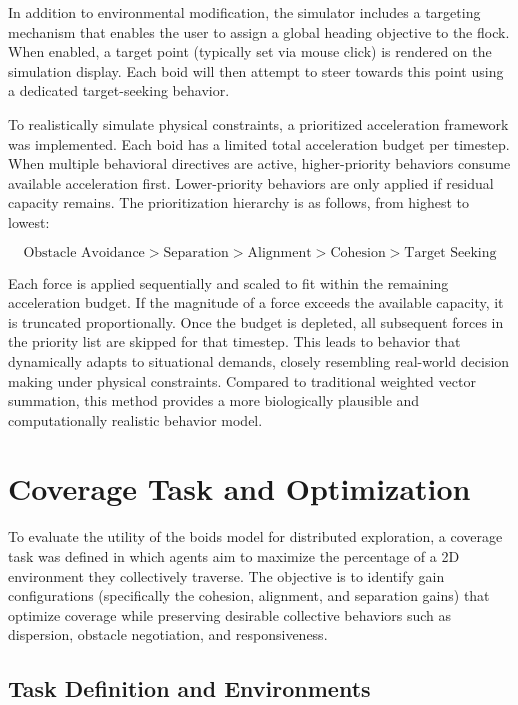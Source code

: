 \documentclass[12pt]{article}
\begin{document}
In addition to environmental modification, the simulator includes a targeting mechanism that enables the user to assign a global heading objective to the flock. When enabled, a target point (typically set via mouse click) is rendered on the simulation display. Each boid will then attempt to steer towards this point using a dedicated target-seeking behavior.

\sloppypar
To realistically simulate physical constraints, a prioritized acceleration framework was implemented. Each boid has a limited total acceleration budget per timestep. When multiple behavioral directives are active, higher-priority behaviors consume available acceleration first. Lower-priority behaviors are only applied if residual capacity remains. The prioritization hierarchy is as follows, from highest to lowest:

\[\text{Obstacle Avoidance} > \text{Separation} > \text{Alignment} > \text{Cohesion} > \text{Target Seeking}\]

Each force is applied sequentially and scaled to fit within the remaining acceleration budget. If the magnitude of a force exceeds the available capacity, it is truncated proportionally. Once the budget is depleted, all subsequent forces in the priority list are skipped for that timestep. This leads to behavior that dynamically adapts to situational demands, closely resembling real-world decision making under physical constraints. Compared to traditional weighted vector summation, this method provides a more biologically plausible and computationally realistic behavior model.

\section{Coverage Task and Optimization}

To evaluate the utility of the boids model for distributed exploration, a coverage task was defined in which agents aim to maximize the percentage of a 2D environment they collectively traverse. The objective is to identify gain configurations (specifically the cohesion, alignment, and separation gains) that optimize coverage while preserving desirable collective behaviors such as dispersion, obstacle negotiation, and responsiveness.

\subsection{Task Definition and Environments}
\end{document}
